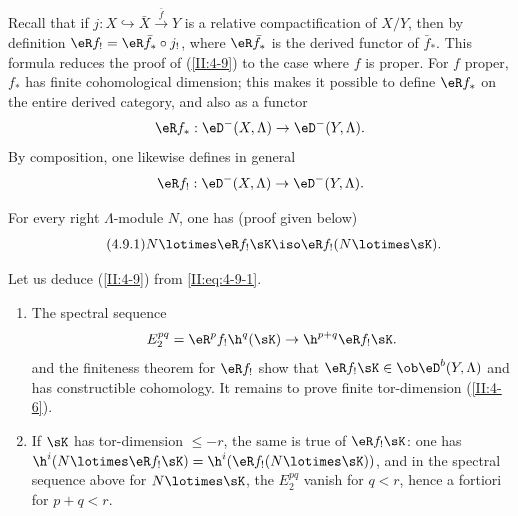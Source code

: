 \documentclass[oneside]{book}
\begin{document}
Recall that if $j:X\hookrightarrow \bar X \xrightarrow{\bar f} Y$ is a
relative compactification of $X/Y$, then by definition
$\eR f_! = \eR \bar f_* \circ j_!$, where $\eR \bar f_*$ is the derived
functor of $\bar f_*$. This formula reduces the proof of (\ref{II:4-9}) to
the case where $f$ is proper. For $f$ proper, $f_*$ has finite cohomological
dimension; this makes it possible to define $\eR f_*$ on the entire derived
category, and also as a functor
\[
  \eR f_* : \eD^-(X,\Lambda) \to \eD^-(Y,\Lambda) \text{.}
\]
By composition, one likewise defines in general
\[
  \eR f_! : \eD^-(X,\Lambda) \to \eD^-(Y,\Lambda) \text{.}
\]

For every right $\Lambda$-module $N$, one has (proof given below)
\begin{equation*}\tag{4.9.1}\label{II:eq:4-9-1}
  N\lotimes \eR f_! \sK \iso \eR f_! (N\lotimes \sK) \text{.}
\end{equation*}

Let us deduce (\ref{II:4-9}) from \eqref{II:eq:4-9-1}.
\begin{enumerate}[\indent a)]
  \item The spectral sequence
    \[
      E_2^{p q} = \eR^p f_! \h^q(\sK) \rightarrow \h^{p+q} \eR f_! \sK \text{.}
    \]
    and the finiteness theorem for $\eR f_!$ show that
    $\eR f_!\sK\in \ob \eD^b(Y,\Lambda)$ and has constructible cohomology.
    It remains to prove finite tor-dimension (\ref{II:4-6}).
  \item If $\sK$ has tor-dimension $\leqslant -r$, the same is true of
    $\eR f_! \sK$: one has
    $\h^i(N\lotimes \eR f_! \sK) = \h^i(\eR f_!(N\lotimes \sK))$, and in the
    spectral sequence above for $N\lotimes \sK$, the $E_2^{p q}$ vanish for
    $q<r$, hence a fortiori for $p+q<r$.
\end{enumerate}
\end{document}
